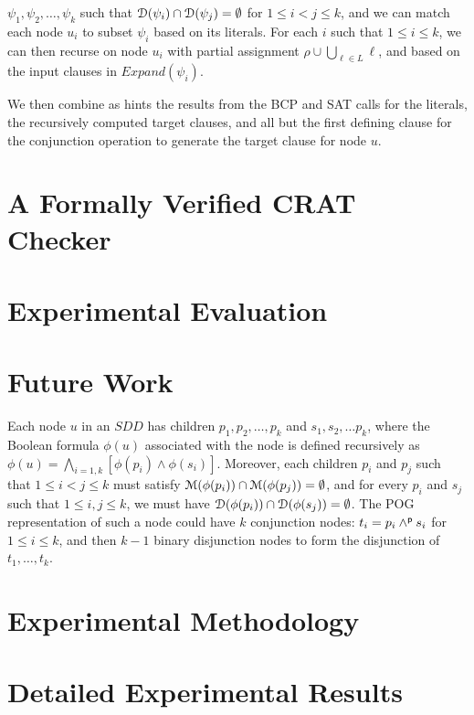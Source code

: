 \documentclass[letterpaper,USenglish,cleveref, autoref, thm-restate]{lipics-v2021}
\newcommand{\pand}{\mathbin{\land^{\sf p}}}
\newcommand{\lit}{\ell}
\newcommand{\dependencyset}{{\cal D}}
\newcommand{\passign}{\rho}
\newcommand{\modelset}{{\cal M}}
\newcommand{\prov}{\mathit{Expand}}
\begin{document}
\begin{enumerate}
\begin{enumerate}
  $\psi_1, \psi_2, \ldots, \psi_k$ such that $\dependencyset(\psi_i)
  \cap \dependencyset(\psi_j) = \emptyset$ for $1 \leq i < j \leq k$,
  and we can match each node $u_i$ to subset $\psi_i$ based on its
  literals.
  For each $i$ such that $1 \leq i \leq k$, we can then recurse on node $u_i$
  with partial assignment $\passign \cup \bigcup_{\lit \in L} \lit$, and based on the input clauses in $\prov(\psi_i)$.
\end{enumerate}
  We then combine as hints the results from the BCP and SAT calls for
  the literals, the recursively computed target clauses, and all but
  the first defining clause for the conjunction operation to generate the target clause for node $u$.
\end{enumerate}



\label{sect:lemma}

\section{A Formally Verified CRAT Checker}

\section{Experimental Evaluation}

\section{Future Work}
\label{sect:future}


Each node $u$ in an $SDD$ has children $p_1, p_2, \ldots, p_k$ and
$s_1, s_2, \ldots p_k$, where the Boolean formula $\phi(u)$ associated
with the node is defined recursively as $\phi(u) = \bigwedge_{i=1,k}
[\phi(p_i) \land \phi(s_i)]$.  Moreover, each children $p_i$ and $p_j$
such that $1 \leq i < j \leq k$ must satisfy $\modelset(\phi(p_i))
\cap \modelset(\phi(p_j)) = \emptyset$, and for every $p_i$ and $s_j$
such that $1 \leq i,j \leq k$, we must have $\dependencyset(\phi(p_i))
\cap \dependencyset(\phi(s_j)) = \emptyset$.  The POG representation
of such a node could have $k$ conjunction nodes: $t_i = p_i \pand s_i$
for $1 \leq i \leq k$, and then $k-1$ binary disjunction nodes to form
the disjunction of $t_1, \ldots, t_k$.




\appendix

\section{Experimental Methodology}

\section{Detailed Experimental Results}
\end{document}
